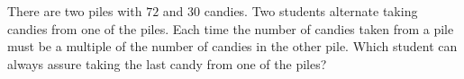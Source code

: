 There are two piles with $72$ and $30$ candies. Two students alternate taking candies from one of the piles. Each time the number of candies taken from a pile must be a multiple of the number of candies in the other pile. Which student can always assure taking the last candy from one of the piles?